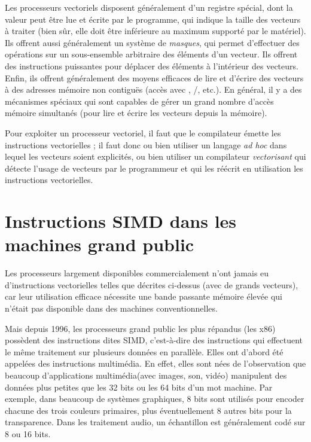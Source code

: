 Les processeurs vectoriels disposent généralement d'un registre spécial, dont la
valeur peut être lue et écrite par le programme, qui indique la taille des
vecteurs à traiter (bien sûr, elle doit être inférieure au maximum supporté par
le matériel). Ils offrent aussi généralement un système de \emph{masques}, qui
permet d'effectuer des opérations sur un sous-ensemble arbitraire des éléments
d'un vecteur. Ils offrent des instructions puissantes pour déplacer des éléments
à l'intérieur des vecteurs. Enfin, ils offrent généralement des moyens efficaces
de lire et d'écrire des vecteurs à des adresses mémoire non contiguës (accès
avec , /, etc.). En général, il
y a des mécanismes spéciaux qui sont capables de gérer un grand nombre d'accès
mémoire simultanés (pour lire et écrire les vecteurs depuis la mémoire).

Pour exploiter un processeur vectoriel, il faut que le compilateur émette les
instructions vectorielles ; il faut donc ou bien utiliser un langage \emph{ad
  hoc} dans lequel les vecteurs soient explicités, ou bien utiliser un
compilateur \emph{vectorisant} qui détecte l'usage de vecteurs par le
programmeur et qui les réécrit en utilisation les instructions vectorielles.

\section{Instructions SIMD dans les machines \og grand public\fg}

Les processeurs largement disponibles commercialement n'ont jamais eu
d'instructions vectorielles telles que décrites ci-dessus (avec de grands
vecteurs), car leur utilisation efficace nécessite une bande passante mémoire
élevée qui n'était pas disponible dans des machines conventionnelles.

Mais depuis 1996, les processeurs grand public les plus répandus (les x86)
possèdent des instructions dites SIMD, c'est-à-dire des instructions qui
effectuent le même traitement sur plusieurs données en parallèle. Elles ont
d'abord été appelées des instructions \og multimédia\fg. En effet, elles sont
nées de l'observation que beaucoup d'applications \og multimédia\fg (avec
images, son, vidéo) manipulent des données plus petites que les 32 bits ou les
64 bits d'un mot machine. Par exemple, dans beaucoup de systèmes graphiques, 8
bits sont utilisés pour encoder chacune des trois couleurs primaires, plus
éventuellement 8 autres bits pour la transparence. Dans les traitement audio, un
échantillon est généralement codé sur 8 ou 16 bits.

